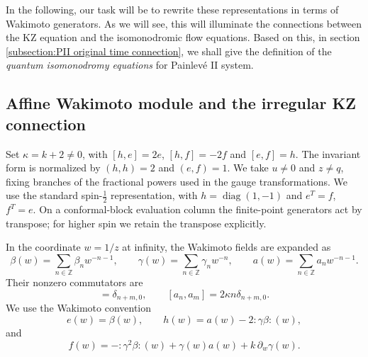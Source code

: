 \documentclass[a4paper,11pt]{article}
\numberwithin{equation}{section}
\begin{document}
In the following, our task will be to rewrite these representations in terms of Wakimoto generators. As we will see, this will illuminate the connections between the KZ equation and the isomonodromic flow equations.  Based on this, in section \ref{subsection:PII original time connection}, we shall give the definition of
the {\it{quantum isomonodromy equations}} for Painlev\'e II system. 

\subsection{Affine Wakimoto module and the irregular KZ connection}
\label{subsection:PII original affine construction}

Set $\kappa=k+2\neq0$, with $[h,e]=2e$, $[h,f]=-2f$ and
$[e,f]=h$.  The invariant form is normalized by $(h,h)=2$ and
$(e,f)=1$.  We take $u\neq0$ and $z\neq q$, fixing
branches of the fractional powers used in the gauge transformations.
We use the standard spin-$\frac{1}{2}$ representation, with
$h=\operatorname{diag}(1,-1)$ and $e^{T}=f$, $f^{T}=e$.
On a conformal-block evaluation column the finite-point generators act
by transpose; for higher spin we retain the transpose explicitly.

In the coordinate $w=1/z$ at infinity, the Wakimoto fields are expanded as
\begin{equation}
	\beta(w)=\sum_{n\in\mathbb{Z}}\beta_{n} w^{-n-1},
	\qquad
	\gamma(w)=\sum_{n\in\mathbb{Z}}\gamma_{n} w^{-n},
	\qquad
	a(w)=\sum_{n\in\mathbb{Z}}a_{n} w^{-n-1}.
\end{equation}
Their nonzero commutators are
\begin{equation}
 [\beta_{n},\gamma_{m}]=\delta_{n+m,0},\qquad
 [a_{n},a_{m}]=2\kappa n\delta_{n+m,0}.
\end{equation}
We use the Wakimoto convention
\begin{equation}
	e(w)=\beta(w),
	\qquad
	h(w)=a(w)-2:\gamma\beta:(w),
\end{equation}
and
\begin{equation}
	f(w)=-:\gamma^{2}\beta:(w)+\gamma(w)a(w)+k\,\partial_{w}\gamma(w).
\end{equation}
\end{document}
